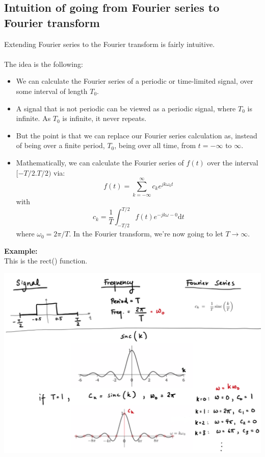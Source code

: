 \documentclass[10pt]{article}
\newcommand{\example}{\textbf{Example: }}
\begin{document}
\subsection*{Intuition of going from Fourier series to Fourier transform}
Extending Fourier series to the Fourier transform is fairly intuitive.\\\\
The idea is the following:
\begin{itemize}
    \item We can calculate the Fourier series of a periodic or time-limited signal, over some interval of length $T_0$.
    \item A signal that is not periodic can be viewed as a periodic signal, where $T_0$ is infinite.  As $T_0$ is infinite, it never repeats.
    \item But the point is that we can replace our Fourier series calculation as, instead of being over a finite period, $T_0$, being over all time, from $t = -\infty$ to $\infty$.
    \item Mathematically, we can calculate the Fourier series of $f(t)$ over the interval $[-T/2. T/2)$ via:
    \[f(t) = \sum_{k = -\infty}^\infty c_k e^{jk\omega_0 t}\]
    with 
    \[c_k = \frac{1}{T} \int_{-T/2}^{T/2} f(t) e^{-jk\omega-0}\text{d}t\]
    where $\omega_0 = 2\pi/T$.  In the Fourier transform, we're now going to let $T \rightarrow \infty$.
\end{itemize}
\example\\
This is the rect() function.
\begin{center}
    \includegraphics[scale=0.65]{W5_1.png}
\end{center}
\end{document}

